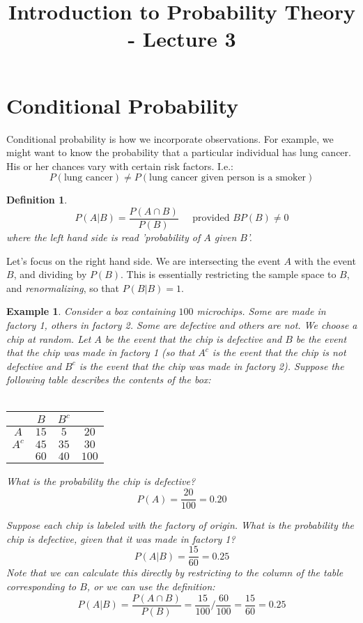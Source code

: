 \documentclass[12pt]{article} %
\title{Introduction to Probability Theory - Lecture 3}
\newtheorem{defn}{Definition}
\newtheorem{example}{Example}
\begin{document}
\maketitle
\section{Conditional Probability}
Conditional probability is how we incorporate observations. For example, we might want to know the probability that a particular individual has lung cancer. His or her chances vary with certain risk factors. I.e.:
$$P(\textrm{lung cancer})\neq P(\textrm{lung cancer given person is a smoker})$$
\begin{defn}
$$P(A|B) = \frac{P(A\cap B)}{P(B)} \;\;\;\;\;\textrm{provided }BP(B)\neq 0$$
where the left hand side is read 'probability of $A$ given $B$'. 
\end{defn}
Let's focus on the right hand side. We are intersecting the event $A$ with the event $B$, and dividing by $P(B)$. This is essentially restricting the sample space to $B$, and \emph{renormalizing}, so that $P(B|B) = 1$.
\begin{example}
Consider a box containing $100$ microchips. Some are made in factory 1, others in factory 2. Some are defective and others are not. We choose a chip at random. Let $A$ be the event that the chip is defective and $B$ be the event that the chip was made in factory 1 (so that $A^c$ is the event that the chip is not defective and $B^c$ is the event that the chip was made in factory 2). Suppose the following table describes the contents of the box:\\\\
\begin{tabular}{c|c c|c}
& $B$ & $B^c$& \\
\hline
$A$& $15$& $5$ &$20$\\
$A^c$& $45$ & $35$ &$30$\\
\hline
& $60$ & $40$ & $100$
\end{tabular}

What is the probability the chip is defective?
$$P(A) = \frac{20}{100} = 0.20$$

Suppose each chip is labeled with the factory of origin. What is the probability the chip is defective, given that it was made in factory 1?
$$P(A|B) = \frac{15}{60} = 0.25$$
Note that we can calculate this directly by restricting to the column of the table corresponding to $B$, or we can use the definition:
$$P(A|B) = \frac{P(A\cap B)}{P(B)} = \frac{15}{100}/\frac{60}{100} =  \frac{15}{60} = 0.25$$
\end{example}
\end{document}
